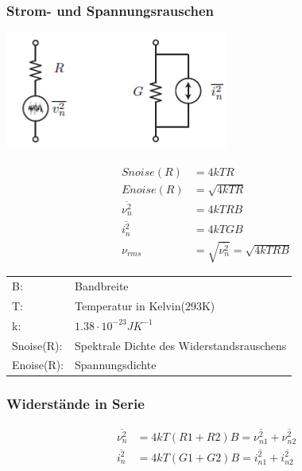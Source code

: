 \subsubsection{Strom- und Spannungsrauschen}
\begin{minipage}{0.4\textwidth}
	\includegraphics[scale=0.6]{pictures/widerstandrauschen}\\
\end{minipage}
\begin{minipage}{0.6\textwidth}
	\begin{align}
		Snoise(R)&=4kTR\\
		Enoise(R)&=\sqrt{4kTR}\\
		\overline{\nu^2_{n}}&=4kTRB\\
		\overline{i^2_{n}}&=4kTGB\\
		\nu_{rms} &= \sqrt{\overline{\nu^2_{n}}} = \sqrt{4kTRB}
	\end{align}
	\begin{tabular}{ll}
		B:&Bandbreite\\
		T:&Temperatur in Kelvin(293K)\\
		k:&$1.38 \cdot 10^{-23}JK^{-1}$\\
		Snoise(R):&Spektrale Dichte des Widerstandsrauschens\\
		Enoise(R):&Spannungsdichte
	\end{tabular}
\end{minipage}

\subsubsection{Widerstände in Serie}
\begin{minipage}{0.4\textwidth}
	\begin{center}
		
	\end{center}
\end{minipage}
\begin{minipage}{0.6\textwidth}
	\begin{align}
		\overline{\nu^2_{n}}&=4kT(R1+R2)B=\overline{\nu^2_{n1}}+\overline{\nu^2_{n2}}\\
		\overline{i^2_{n}}&=4kT(G1+G2)B=\overline{i^2_{n1}}+\overline{i^2_{n2}}
	\end{align}
\end{minipage}

